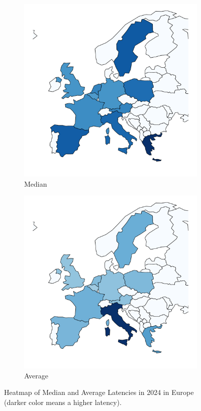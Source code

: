 \begin{figure}
	\centering
	\begin{subfigure}[t]{0.47\linewidth}
		\includegraphics[width=\linewidth]{chapters/4-results/latency/img/heatmap-median-latencies-2024.pdf}
		\caption{Median}
	\end{subfigure}
	\begin{subfigure}[t]{0.47\linewidth}
		\includegraphics[width=\linewidth]{chapters/4-results/latency/img/heatmap-average-latencies-2024.pdf}
		\caption{Average}
	\end{subfigure}
	\caption{Heatmap of Median and Average Latencies in 2024 in Europe
		(darker color means a higher latency).}
	\label{fig:heatmap-latencies-europe}
\end{figure}

